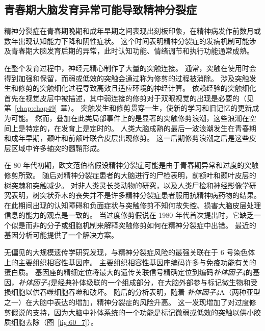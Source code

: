 \subsection{青春期大脑发育异常可能导致精神分裂症}

精神分裂症在青春期晚期和成年早期之间表现出刻板印象，在精神病发作前数月或数年出现认知能力下降和阴性症状。
这个时间表明精神分裂症的发病机制可能涉及青春期大脑发育后期的异常，此时认知功能、情绪调节和执行功能通常成熟。


在整个发育过程中，神经元精心制作了大量的突触连接。
通常，突触在使用时会得到加强和保留，而弱或低效的突触会通过称为修剪的过程被消除。
涉及突触发生和修剪的突触细化过程导致高效且适应环境的神经计算。
依赖经验的突触细化首先在视觉皮层中被描述，其中弱连接的修剪对于双眼视觉的出现是必要的（见第~\ref{chap:chap49}~章）。
突触发生和修剪贯穿一生，使新的学习和旧记忆的更新成为可能。
然而，叠加在此类局部事件上的是显著的突触修剪浪潮，这些浪潮在空间上是特定的，在发育上是定时的。
人类大脑成熟的最后一波浪潮发生在青春期和成年早期，颞叶和前额叶联合皮层出现修剪。
这一后期修剪浪潮之后是这些皮层区域中许多轴突的髓鞘形成。


在 80 年代初期，欧文范伯格假设精神分裂症可能是由于青春期异常和过度的突触修剪所致。
随后对精神分裂症患者的大脑进行的尸检表明，前额叶和颞叶皮层的树突棘和突触减少。
对非人类灵长类动物的研究，以及人类尸检和神经影像学研究表明，树突状乔木的丧失并不是许多精神分裂症患者服用抗精神病药物的结果。
在此期间出现的认知障碍和负面症状与突触修剪不知何故失控、损害大脑皮层处理信息的能力的观点是一致的。
当过度修剪假说在 1980 年代首次提出时，它缺乏一个似是而非的分子或细胞机制来解释突触修剪如何在精神分裂症中出错。
最近的基因分析可能提供了一个解决方案。


无偏见的大规模遗传学研究发现，与精神分裂症风险的最强关联在于 6 号染色体上的主要组织相容性基因座。
主要组织相容性基因座编码许多与免疫功能有关的蛋白质。
基因座的精细定位将最大的遗传关联信号精确定位到编码\textit{补体因子4}的基因，\textit{补体因子4}是经典补体级联的一个组成部分，在大脑外部参与标记微生物和受损细胞以供吞噬细胞吞噬和破坏。
随后的分析表明，随着 \textit{补体因子4}A（两种亚型之一）在大脑中表达的增加，精神分裂症的风险升高。
这一发现增加了对过度修剪假说的支持，因为大脑中补体系统的一个功能是标记微弱或低效的突触以供小胶质细胞去除（图~\ref{fig:60_7}）。


